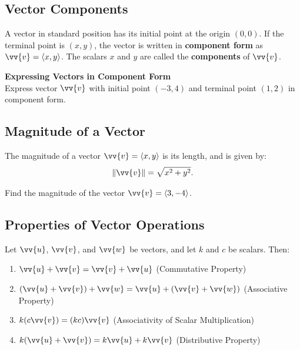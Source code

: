 \documentclass{article}
\begin{document}
\subsection*{Vector Components}

A vector in standard position has its initial point at the origin \((0, 0)\). If the terminal point is \((x, y)\), the vector is written in \textbf{component form} as \(\vv{v} = \langle x, y \rangle\). The scalars \(x\) and \(y\) are called the \textbf{components} of \(\vv{v}\).

\begin{exercisebox}
    \textbf{Expressing Vectors in Component Form} \\
    Express vector \(\vv{v}\) with initial point \((-3, 4)\) and terminal point \((1, 2)\) in component form.
\end{exercisebox}

\subsection*{Magnitude of a Vector}

\begin{definitionbox}
    The magnitude of a vector \(\vv{v} = \langle x, y \rangle\) is its length, and is given by:
    \[
    \|\vv{v}\| = \sqrt{x^2 + y^2}.
    \]
\end{definitionbox}

\begin{exercisebox}
    Find the magnitude of the vector \(\vv{v} = \langle 3, -4 \rangle\).
\end{exercisebox}

\subsection*{Properties of Vector Operations}

\begin{theorembox}
    Let \(\vv{u}\), \(\vv{v}\), and \(\vv{w}\) be vectors, and let \(k\) and \(c\) be scalars. Then:
    \begin{enumerate}
        \item \(\vv{u} + \vv{v} = \vv{v} + \vv{u}\) \quad (Commutative Property)
        \item \((\vv{u} + \vv{v}) + \vv{w} = \vv{u} + (\vv{v} + \vv{w})\) \quad (Associative Property)
        \item \(k(c\vv{v}) = (kc)\vv{v}\) \quad (Associativity of Scalar Multiplication)
        \item \(k(\vv{u} + \vv{v}) = k\vv{u} + k\vv{v}\) \quad (Distributive Property)
    \end{enumerate}
\end{theorembox}
\end{document}
